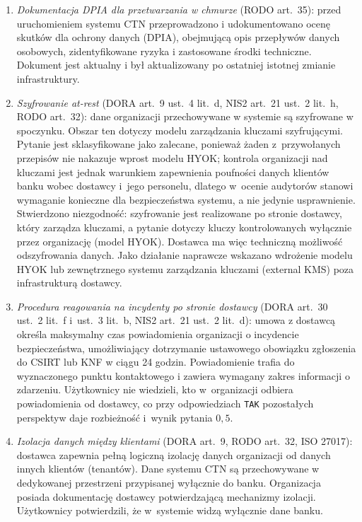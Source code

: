\begin{enumerate}[label=(\roman*)]
  \item \textit{Dokumentacja DPIA dla przetwarzania w chmurze} (RODO art.~35): przed uruchomieniem systemu CTN przeprowadzono i udokumentowano ocenę skutków dla ochrony danych (DPIA), obejmującą opis przepływów danych osobowych, zidentyfikowane ryzyka i zastosowane środki techniczne. Dokument jest aktualny i był aktualizowany po ostatniej istotnej zmianie infrastruktury.

  \item \textit{Szyfrowanie at-rest} (DORA art.~9 ust.~4 lit.~d, NIS2 art.~21 ust.~2 lit.~h, RODO art.~32): dane organizacji przechowywane w systemie są szyfrowane w spoczynku. Obszar ten dotyczy modelu zarządzania kluczami szyfrującymi. Pytanie jest sklasyfikowane jako zalecane, ponieważ żaden z~przywołanych przepisów nie nakazuje wprost modelu HYOK; kontrola organizacji nad kluczami jest jednak warunkiem zapewnienia poufności danych klientów banku wobec dostawcy i~jego personelu, dlatego w~ocenie audytorów stanowi wymaganie konieczne dla bezpieczeństwa systemu, a nie jedynie usprawnienie. Stwierdzono niezgodność: szyfrowanie jest realizowane po stronie dostawcy, który zarządza kluczami, a pytanie dotyczy kluczy kontrolowanych wyłącznie przez organizację (model HYOK). Dostawca ma więc techniczną możliwość odszyfrowania danych. Jako działanie naprawcze wskazano wdrożenie modelu HYOK lub zewnętrznego systemu zarządzania kluczami (external KMS) poza infrastrukturą dostawcy.

  \item \textit{Procedura reagowania na incydenty po stronie dostawcy} (DORA art.~30 ust.~2 lit.~f i~ust.~3 lit.~b, NIS2 art.~21 ust.~2 lit.~d): umowa z dostawcą określa maksymalny czas powiadomienia organizacji o incydencie bezpieczeństwa, umożliwiający dotrzymanie ustawowego obowiązku zgłoszenia do CSIRT lub KNF w ciągu 24 godzin. Powiadomienie trafia do wyznaczonego punktu kontaktowego i zawiera wymagany zakres informacji o zdarzeniu. Użytkownicy nie wiedzieli, kto w~organizacji odbiera powiadomienia od dostawcy, co przy odpowiedziach \texttt{TAK} pozostałych perspektyw daje rozbieżność i~wynik pytania $0{,}5$.

  \item \textit{Izolacja danych między klientami} (DORA art.~9, RODO art.~32, ISO 27017): dostawca zapewnia pełną logiczną izolację danych organizacji od danych innych klientów (tenantów). Dane systemu CTN są przechowywane w dedykowanej przestrzeni przypisanej wyłącznie do banku. Organizacja posiada dokumentację dostawcy potwierdzającą mechanizmy izolacji. Użytkownicy potwierdzili, że w~systemie widzą wyłącznie dane banku.
\end{enumerate}

